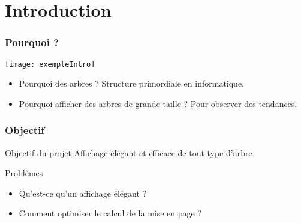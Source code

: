 \section{Introduction}

\begin{frame}
	\frametitle{Pourquoi ?}
	\begin{center}
		\texttt{[image: exempleIntro]} \\
		\begin{itemize}
			\item Pourquoi des arbres ? Structure primordiale en informatique. 
			\item Pourquoi afficher des arbres de grande taille ? Pour observer des tendances. %
		\end{itemize}
	\end{center}
\end{frame}

\begin{frame}
	\frametitle{Objectif}
	\begin{block}{Objectif du projet}
		Affichage élégant et efficace de tout type d'arbre
	\end{block}
	\begin{alertblock}{Problèmes}
		\begin{itemize}
			\item Qu'est-ce qu'un affichage élégant ?
			\item Comment optimiser le calcul de la mise en page ?
		\end{itemize}
	\end{alertblock}
\end{frame}


